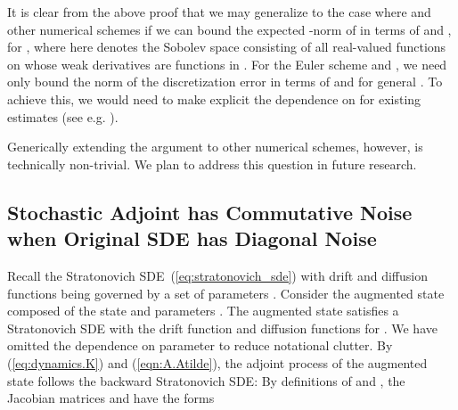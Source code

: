 \documentclass[twoside]{article}
\begin{document}
It is clear from the above proof that we may generalize to the case where  and other numerical schemes if we can bound the expected -norm of  in terms of  and , for ,
where  here denotes the Sobolev space consisting of all real-valued functions on  whose weak derivatives are functions in .
For the Euler scheme and , we need only bound the  norm of the discretization error in terms of  and  for general .
To achieve this, we would need to make explicit the dependence on  for existing estimates (see e.g. \cite[Chapter 10]{kloeden2013numerical}).

Generically extending the argument to other numerical schemes, however, is technically non-trivial.
We plan to address this question in future research.


 \subsection{Stochastic Adjoint has Commutative Noise when Original SDE has Diagonal Noise} \label{app:commutativity}
\newcommand{\aug}{ {\text{aug}} }
Recall the Stratonovich SDE~(\ref{eq:stratonovich_sde}) with drift and diffusion functions  being governed by a set of parameters .
Consider the augmented state composed of the state and parameters . 
The augmented state satisfies a Stratonovich SDE with the drift function  and diffusion functions  for . 
We have omitted the dependence on parameter  to reduce notational clutter. 
By (\ref{eq:dynamics.K}) and (\ref{eqn:A.Atilde}), the adjoint process of the augmented state follows the backward Stratonovich SDE:
By definitions of  and , the Jacobian matrices  and  have the forms
\vspace{-1mm}
\end{document}
